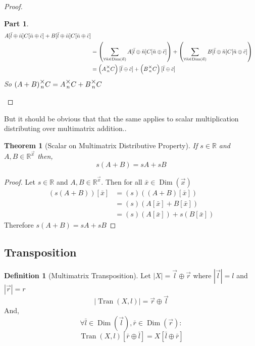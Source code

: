 \documentclass[12pt]{article}
\theoremstyle{definition}
\newtheorem{definition}{Definition}[section]
\theoremstyle{plain}
\newtheorem{theorem}{Theorem}[section]
\theoremstyle{ppart}
\newtheorem{ppart}{Part}
\DeclareMathOperator{\Dim}{Dim}
\DeclareMathOperator{\Tran}{Tran}
\newcommand{\mmult}[1]{\text{\raisebox{1ex}{$\underset{#1}{\times}$}}}
\begin{document}
\begin{landscape}
\begin{proof}
\begin{ppart}
\begin{align*}
    A[\bar{l} \oplus \bar{n}]C[\bar{n} \oplus \bar{c}]
    +B[\bar{l} \oplus \bar{n}]C[\bar{n} \oplus \bar{c}] \\
 &= \left(\sum_{\forall \bar{n} \in \Dim(\vec{n})}
    A[\bar{l} \oplus \bar{n}]C[\bar{n} \oplus \bar{c}]\right)
    +
    \left(\sum_{\forall \bar{n} \in \Dim(\vec{n})}
    B[\bar{l} \oplus \bar{n}]C[\bar{n} \oplus \bar{c}]\right) \\
 &= \left(A \mmult{n} C\right)[\bar{l} \oplus \bar{c}]
    +\left(B \mmult{n} C\right)[\bar{l} \oplus \bar{c}]
\end{align*}
So $(A+B) \mmult{n} C = A \mmult{n} C + B \mmult{n} C$ 
\end{ppart}
\end{proof}
\end{landscape}

But it should be obvious that that the same applies to scalar 
multiplication distributing over multimatrix addition..
\begin{theorem}[Scalar on Multimatrix Distributive Property]
If $s \in \mathbb{R}$ and $A, B \in \mathbb{R}^{\vec{x}}$ then,
\[ s(A + B) = sA + sB \]
\end{theorem}
\begin{proof}
Let $s \in \mathbb{R}$ and $A, B \in \mathbb{R}^{\vec{x}}$.
Then for all $\bar{x} \in \Dim(\vec{x})$
\begin{align*}
(s(A+B))[\bar{x}]
&= (s)((A+B)[\bar{x}]) \\
&= (s)(A[\bar{x}] + B[\bar{x}]) \\
&= (s)(A[\bar{x}]) + s(B[\bar{x}])
\end{align*}
Therefore $s(A+B) = sA + sB$
\end{proof}

\subsection{Transposition}

\begin{definition}[Multimatrix Transposition]
Let $|X| = \vec{l} \oplus \vec{r}$ where $|\vec{l}| = l$ and $|\vec{r}| = r$
\[ |\Tran(X, l)| = \vec{r} \oplus \vec{l} \]
And,
\[ \forall \bar{l} \in \Dim(\vec{l}), \bar{r} \in \Dim(\vec{r}) : \]
\[ \Tran(X, l)[\bar{r} \oplus \bar{l}] = X[\bar{l} \oplus \bar{r}] \]
\end{definition}
\end{document}
